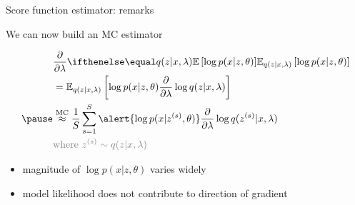 \begin{frame}{Score function estimator: remarks}


We can now build an MC estimator
\begin{small}
\begin{equation*}
\begin{aligned}
&\pdv{\lambda}\E[q(z|x,\lambda)]{\log p(x|z,\theta)} \\ 
&= \mathbb E_{q(z|x,\lambda)} \left[  \log p(x|z,\theta)  \pdv{\lambda}\log q(z|x,\lambda)\right] \\ \pause 
&\overset{\text{MC}}{\approx} \frac{1}{S} \sum_{s=1}^S \alert{\log p(x|z^{(s)}, \theta)} \pdv{\lambda}\log q(z^{(s)}|x, \lambda) \\
&\textcolor{gray}{\text{where } z^{(s)} \sim q(z|x, \lambda)}
\end{aligned}
\end{equation*}
\end{small}

\pause
\begin{itemize}
	\item magnitude of $\log p(x|z, \theta)$ varies widely \pause 
	\item model likelihood does not contribute to direction of gradient 
\end{itemize}
\end{frame}


